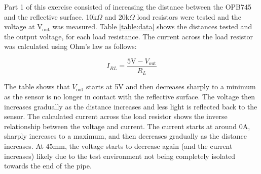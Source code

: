 \documentclass[CMPE]{KGCOEReport}
\begin{document}
Part 1 of this exercise consisted of increasing the distance between the OPB745 and the reflective surface. 10k$\Omega$ and 20k$\Omega$ load resistors were tested and the voltage at V$_{\text{out}}$ was measured. Table \ref{table:data} shows the distances tested and the output voltage, for each load resistance. The current across the load resistor was calculated using Ohm's law as follows:

\[ I_{RL} = \frac{5\text{V} - V_{\text{out}}}{R_L} \]

The table shows that $V_{\text{out}}$ starts at 5V and then decreases sharply to a minimum as the sensor is no longer in contact with the reflective surface. The voltage then increases gradually as the distance increases and less light is reflected back to the sensor. The calculated current across the load resistor shows the inverse relationship between the voltage and current. The current starts at around 0A, sharply increases to a maximum, and then decreases gradually as the distance increases. At 45mm, the voltage starts to decrease again (and the current increases) likely due to the test environment not being completely isolated towards the end of the pipe.
\end{document}

